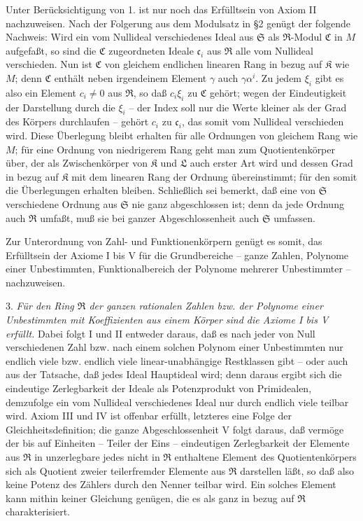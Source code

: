 \documentclass[11pt]{article}
\providecommand{\mR}{\mathfrak{R}}
\providecommand{\mK}{\mathfrak{K}}
\providecommand{\mL}{\mathfrak{L}}
\providecommand{\mS}{\mathfrak{S}}
\providecommand{\mC}{\mathfrak{C}}
\providecommand{\mc}{\mathfrak{c}}
\begin{document}
Unter Berücksichtigung von 1. ist nur noch das Erfülltsein von Axiom II nachzuweisen. Nach der Folgerung aus dem Modulsatz in §2 genügt der folgende Nachweis: Wird ein vom Nullideal verschiedenes Ideal aus $\mS$ als $\mR$-Modul $\mC$ in $M$ aufgefaßt, so sind die $\mC$ zugeordneten Ideale $\mc_i$ aus $\mR$ alle vom Nullideal verschieden. Nun ist $\mC$ von gleichem endlichen linearen Rang in bezug auf $\mK$ wie $M$; denn $\mC$ enthält neben irgendeinem Element $\gamma$ auch $\gamma\alpha^i$. Zu jedem $\xi_i$ gibt es also ein Element $c_i\ne0$ aus $\mR$, so daß $c_i\xi_i$ zu $\mC$ gehört; wegen der Eindeutigkeit der Darstellung durch die $\xi_i$ -- der Index soll nur die Werte kleiner als der Grad des Körpers durchlaufen -- gehört $c_i$ zu $\mc_i$, das somit vom Nullideal verschieden wird. Diese Überlegung bleibt erhalten für alle Ordnungen von gleichem Rang wie $M$; für eine Ordnung von niedrigerem Rang geht man zum Quotientenkörper über, der als Zwischenkörper von $\mK$ und $\mL$ auch erster Art wird und dessen Grad in bezug auf $\mK$ mit dem linearen Rang der Ordnung übereinstimmt; für den somit die Überlegungen erhalten bleiben. Schließlich sei bemerkt, daß eine von $\mS$ verschiedene Ordnung aus $\mS$ nie ganz abgeschlossen ist; denn da jede Ordnung auch $\mR$ umfaßt, muß sie bei ganzer Abgeschlossenheit auch $\mS$ umfassen.

Zur Unterordnung von Zahl- und Funktionenkörpern genügt es somit, das Erfülltsein der Axiome I bis V für die Grundbereiche -- ganze Zahlen, Polynome einer Unbestimmten, Funktionalbereich der Polynome mehrerer Unbestimmter -- nachzuweisen.

3. \emph{Für den Ring $\mR$ der ganzen rationalen Zahlen bzw. der Polynome einer Unbestimmten mit Koeffizienten aus einem Körper sind die Axiome I bis V erfüllt.} Dabei folgt I und II entweder daraus, daß es nach jeder von Null verschiedenen Zahl bzw. nach einem solchen Polynom einer Unbestimmten nur endlich viele bzw. endlich viele linear-unabhängige Restklassen gibt -- oder auch aus der Tatsache, daß jedes Ideal Hauptideal wird; denn daraus ergibt sich die eindeutige Zerlegbarkeit der Ideale als Potenzprodukt von Primidealen, demzufolge ein vom Nullideal verschiedenes Ideal nur durch endlich viele teilbar wird. Axiom III und IV ist offenbar erfüllt, letzteres eine Folge der Gleichheitsdefinition; die ganze Abgeschlossenheit V folgt daraus, daß vermöge der bis auf Einheiten -- Teiler der Eins -- eindeutigen Zerlegbarkeit der Elemente aus $\mR$ in unzerlegbare jedes nicht in $\mR$ enthaltene Element des Quotientenkörpers sich als Quotient zweier teilerfremder Elemente aus $\mR$ darstellen läßt, so daß also keine Potenz des Zählers durch den Nenner teilbar wird. Ein solches Element kann mithin keiner Gleichung genügen, die es als ganz in bezug auf $\mR$ charakterisiert.
\end{document}
